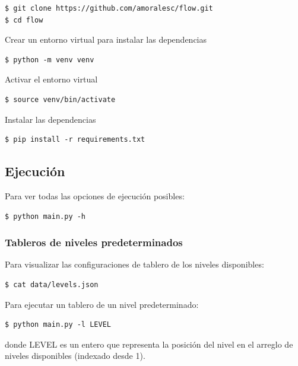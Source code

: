 \documentclass[letter,12pt]{article}
\begin{document}
\begin{verbatim}
$ git clone https://github.com/amoralesc/flow.git
$ cd flow
\end{verbatim}

Crear un entorno virtual para instalar las dependencias

\begin{verbatim}
$ python -m venv venv
\end{verbatim}

Activar el entorno virtual

\begin{verbatim}
$ source venv/bin/activate
\end{verbatim}

Instalar las dependencias

\begin{verbatim}
$ pip install -r requirements.txt
\end{verbatim}

\subsection{Ejecución} \label{documentacion:ejecucion}

Para ver todas las opciones de ejecución posibles: \par

\begin{verbatim}
$ python main.py -h
\end{verbatim}

\subsubsection{Tableros de niveles predeterminados} \label{documentacion:ejecucion:niveles}

Para visualizar las configuraciones de tablero de los niveles disponibles: \par

\begin{verbatim}
$ cat data/levels.json
\end{verbatim}

Para ejecutar un tablero de un nivel predeterminado: \par

\begin{verbatim}
$ python main.py -l LEVEL
\end{verbatim}

donde \textsc{LEVEL} es un entero que representa la posición del nivel en el arreglo de niveles disponibles (indexado desde 1). \par
\end{document}
